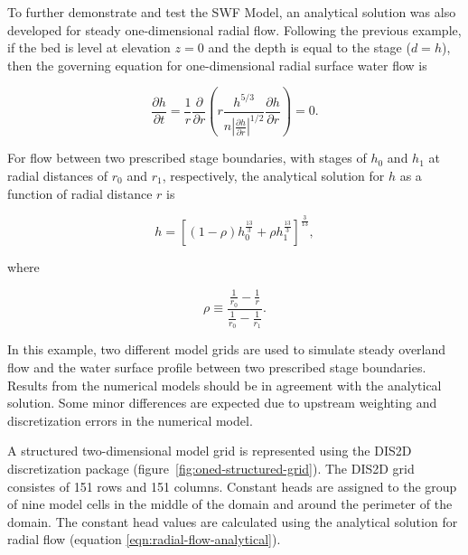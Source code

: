\documentclass[fleqn]{article}
\begin{document}
To further demonstrate and test the SWF Model, an analytical solution was also developed for steady one-dimensional radial flow.  Following the previous example, if the bed is level at elevation $z = 0$ and the depth is equal to the stage ($d = h$), then the governing equation for one-dimensional radial surface water flow is

\begin{equation}
  \frac{\partial h}{\partial t} = \frac{1}{r} \frac{\partial}{\partial r} 
  \left (r \frac{h^{5/3}}{n \left | \frac{\partial h}{\partial r} \right |^{1/2}} 
  \frac{\partial h}{\partial r} \right ) = 0 .
\end{equation}

\noindent For flow between two prescribed stage boundaries, with stages of $h_0$ and $h_1$ at radial distances of $r_0$ and $r_1$, respectively, the analytical solution for $h$ as a function of radial distance $r$ is

\begin{equation}
  h = \left [ \left (1 - \rho \right ) h^{\frac{13}{3}}_{0} + \rho h^{\frac{13}{3}}_{1} \right ]^{\frac{3}{13}} ,
  \label{eqn:radial-flow-analytical}
\end{equation}

\noindent where

\begin{equation}
  \rho \equiv \frac{\frac{1}{r_{0}} - \frac{1}{r}}{\frac{1}{r_{0}} - \frac{1}{r_{1}}} .
  \label{eqn:rho_defined}
\end{equation}

In this example, two different model grids are used to simulate steady overland flow and the water surface profile between two prescribed stage boundaries.  Results from the numerical models should be in agreement with the analytical solution.  Some minor differences are expected due to upstream weighting and discretization errors in the numerical model.

A structured two-dimensional model grid is represented using the DIS2D discretization package (figure~\ref{fig:oned-structured-grid}).  The DIS2D grid consistes of 151 rows and 151 columns.  Constant heads are assigned to the group of nine model cells in the middle of the domain and around the perimeter of the domain.  The constant head values are calculated using the analytical solution for radial flow (equation \ref{eqn:radial-flow-analytical}).
\end{document}
